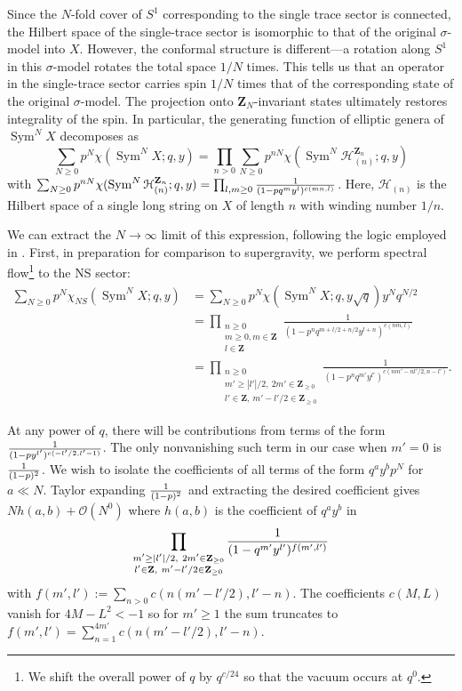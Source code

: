\documentclass[11pt]{amsart}
\newcommand{\Z}{\mathbf Z}
\DeclareMathOperator{\Sym}{Sym} \DeclareMathOperator{\Hom}{Hom}
\theoremstyle{thm}
\numberwithin{equation}{subsection}
\theoremstyle{def}
\theoremstyle{rem}
\begin{document}
Since the $N$-fold cover of $S^1$ corresponding to the single trace sector is connected, the Hilbert space of the single-trace sector is isomorphic to that of the original $\sigma$-model into $X$.  
However, the conformal structure is different---a rotation along $S^1$ in this $\sigma$-model rotates the total space $1/N$ times.
This tells us that an operator in the single-trace sector carries spin $1/N$ times that of the corresponding state of the original $\sigma$-model. 
The projection onto $\Z_N$-invariant states ultimately restores integrality of the spin. 
In particular, the generating function of elliptic genera of $\Sym^N X$ decomposes as
\begin{equation}
\sum_{N\geq 0}p^N \chi(\Sym^N X; q, y) = \prod_{n>0}\sum_{N \geq 0}p^{n N}\chi(\Sym^{N}\mathcal{H}^{\Z_n}_{(n)}; q, y)
\end{equation}
with $\sum_{N \geq 0}p^{n N}\chi(\Sym^{N}\mathcal{H}^{\Z_n}_{(n)}; q, y) = \prod_{l, m\geq0}{1 \over (1 - p q^m y^l)^{c(mn, l)}}$. Here, $\mathcal{H}_{(n)}$ is the Hilbert space of a single long string on $X$ of length $n$ with winding number $1/n$. 

We can extract the $N \rightarrow \infty$ limit of this expression, following the logic employed in \cite{de Boer, MAGOO, BKKP}. First, in preparation for comparison to supergravity, we perform spectral flow\footnote{We shift the overall power of $q$ by $q^{c/24}$ so that the vacuum occurs at $q^0$.} to the NS sector:
\begin{align*}
\sum_{N \geq 0}p^N \chi_{NS}(\Sym^N X; q, y) & = \sum_{N\geq 0}p^N \chi(\Sym^N X; q, y \sqrt{q}) y^N q^{N/2} \\
&= \prod_{\substack{n \geq 0 \\ m \geq 0, m \in \Z \\ l \in \Z}} \frac{1}{(1 - p^n q^{m + l/2 + n/2} y^{l + n})^{c(nm,l)}} \\
&= \prod_{\substack{n \geq0 \\ m' \geq |l'|/2, \ 2 m' \in \Z_{\geq 0} \\ l' \in \Z, \ m' - l'/2 \in \Z_{\geq 0}}} \frac{1}{(1 - p^n q^{m'} y^{l'})^{c(nm' - nl'/2,n-l')}}.
\end{align*}

At any power of $q$, there will be contributions from terms of the form ${1 \over (1 - p y^{l'})^{c(-l'/2, l'-1)}}$. The only nonvanishing such term in our case when $m'=0$ is ${1 \over (1 - p)^2}$. We wish to isolate the coefficients of all terms of the form $q^a y^b p^N$ for $a \ll N$. Taylor expanding ${1 \over (1-p)^2}$ and extracting the desired coefficient gives $N h(a, b) + \mathcal{O}(N^0)$ where $h(a, b)$ is the coefficient of $q^a y^b$ in
\begin{equation}\nonumber
\prod_{\substack{m' \geq |l'|/2, \ 2 m' \in \Z_{\geq 0} \\ l' \in \Z, \  m' - l'/2 \in \Z_{\geq 0}}}{1 \over (1 - q^{m'} y^{l'})^{f(m', l')}}
\end{equation}with $f(m', l'):= \sum_{n >0}c(n(m' -  l'/2), l' - n)$.  The coefficients $c(M, L)$ vanish for $4M-L^2 < -1$ so for $m' \geq 1$ the sum truncates to $f(m', l') = \sum_{n=1}^{4m'}c(n(m' -  l'/2), l' - n)$.
\end{document}
